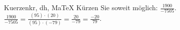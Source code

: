 \begin{MAufgabe}{Kuerzen}{kr, dh, MaTeX}
K\"urzen Sie soweit m\"oglich: $\frac{1900}{-7505}$.\\ 
\ifLsg\MLoesung
\quad $\frac{1900}{-7505}=\frac{(95)\cdot(20)}{(95)\cdot(-79)}=\frac{20}{-79}=\frac{-20}{79}$.\else\relax\fi
 \end{MAufgabe}